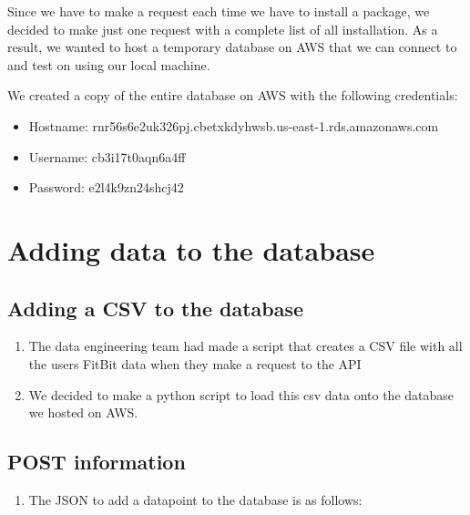 \documentclass[]{book}
\providecommand{\tightlist}{%
  \setlength{\itemsep}{0pt}\setlength{\parskip}{0pt}}
\begin{document}
Since we have to make a request each time we have to install a package, we decided to make just one request with a complete list of all installation. As a result, we wanted to host a temporary database on AWS that we can connect to and test on using our local machine.

We created a copy of the entire database on AWS with the following credentials:

\begin{itemize}
\tightlist
\item
  Hostname: rnr56s6e2uk326pj.cbetxkdyhwsb.us-east-1.rds.amazonaws.com
\item
  Username: cb3i17t0aqn6a4ff
\item
  Password: e2l4k9zn24shcj42
\end{itemize}

\hypertarget{adding-data-to-the-database}{%
\section{Adding data to the database}\label{adding-data-to-the-database}}

\hypertarget{adding-a-csv-to-the-database}{%
\subsection{Adding a CSV to the database}\label{adding-a-csv-to-the-database}}

\begin{enumerate}
\def\labelenumi{\arabic{enumi}.}
\tightlist
\item
  The data engineering team had made a script that creates a CSV file with all the users FitBit data when they make a request to the API
\item
  We decided to make a python script to load this csv data onto the database we hosted on AWS.
\end{enumerate}

\hypertarget{post-information}{%
\subsection{POST information}\label{post-information}}

\begin{enumerate}
\def\labelenumi{\arabic{enumi}.}
\tightlist
\item
  The JSON to add a datapoint to the database is as follows:
\end{enumerate}
\end{document}
